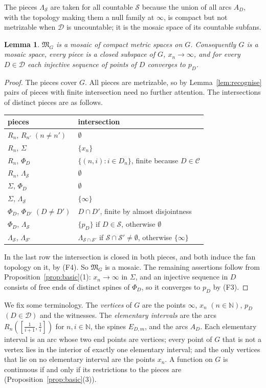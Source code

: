 \documentclass[11pt]{amsart}
\newtheorem{lemma}[theorem]{Lemma}
\theoremstyle{definition}
\theoremstyle{remark}
\newcommand{\N}{\mathbb{N}}
\newcommand{\cD}{\mathcal{D}}
\newcommand{\cC}{\mathcal{C}}
\newcommand{\cS}{\mathcal{S}}
\newcommand{\fM}{\mathfrak{M}}
\numberwithin{equation}{section}
\begin{document}
The pieces $\Lambda_\cS$ are taken for all countable $\cS$ because the union of all arcs $A_D$, with the topology making them a null family at $\infty$, is compact but not metrizable when $\cD$ is uncountable; it is the mosaic space of its countable subfans.

\begin{lemma}\label{lem:Gmosaic}
$\fM_G$ is a mosaic of compact metric spaces on $G$. Consequently $G$ is a mosaic space, every piece is a closed subspace of $G$, $x_n\to\infty$, and for every $D\in\cD$ each injective sequence of points of $D$ converges to $p_D$.
\end{lemma}
\begin{proof}
The pieces cover $G$. All pieces are metrizable, so by Lemma~\ref{lem:recognise} pairs of pieces with finite intersection need no further attention. The intersections of distinct pieces are as follows.
\begin{center}
\begin{tabular}{@{}ll@{}}
\toprule
pieces & intersection\\
\midrule
$R_n$, $R_{n'}$ $(n\ne n')$ & $\emptyset$\\
$R_n$, $\Sigma$ & $\{x_n\}$\\
$R_n$, $\Phi_D$ & $\{(n,i):i\in D_n\}$, finite because $D\in\cC$\\
$R_n$, $\Lambda_\cS$ & $\emptyset$\\
$\Sigma$, $\Phi_D$ & $\emptyset$\\
$\Sigma$, $\Lambda_\cS$ & $\{\infty\}$\\
$\Phi_D$, $\Phi_{D'}$ $(D\ne D')$ & $D\cap D'$, finite by almost disjointness\\
$\Phi_D$, $\Lambda_\cS$ & $\{p_D\}$ if $D\in\cS$, otherwise $\emptyset$\\
$\Lambda_\cS$, $\Lambda_{\cS'}$ & $\Lambda_{\cS\cap\cS'}$ if $\cS\cap\cS'\ne\emptyset$, otherwise $\{\infty\}$\\
\bottomrule
\end{tabular}
\end{center}
In the last row the intersection is closed in both pieces, and both induce the fan topology on it, by (F4). So $\fM_G$ is a mosaic. The remaining assertions follow from Proposition~\ref{prop:basic}(1): $x_n\to\infty$ in $\Sigma$, and an injective sequence in $D$ consists of free ends of distinct spines of $\Phi_D$, so it converges to $p_D$ by (F3).
\end{proof}

We fix some terminology. The \emph{vertices} of $G$ are the points $\infty$, $x_n$ $(n\in\N)$, $p_D$ $(D\in\cD)$ and the witnesses. The \emph{elementary intervals} are the arcs $R_n([\frac1{i+1},\frac1i])$ for $n,i\in\N$, the spines $E_{D,m}$, and the arcs $A_D$. Each elementary interval is an arc whose two end points are vertices; every point of $G$ that is not a vertex lies in the interior of exactly one elementary interval; and the only vertices that lie on no elementary interval are the points $x_n$. A function on $G$ is continuous if and only if its restrictions to the pieces are (Proposition~\ref{prop:basic}(3)).
\end{document}
